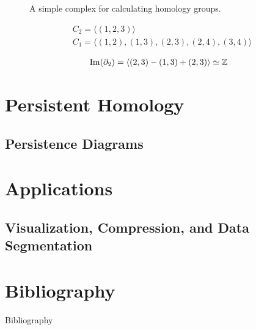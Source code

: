 \begin{frame}
	\begin{figure}
		
		\caption{A simple complex for calculating homology groups.}
	\end{figure}
	\begin{align*}
		&C_2 = \langle (1,2,3) \rangle \\
		&C_1 = \langle (1,2),(1,3),(2,3),(2,4),(3,4) \rangle \\
	\end{align*}
	\begin{align*}
		\operatorname{Im} (\partial_2) = \langle (2,3) - (1,3) + (2,3) \rangle \simeq \mathbb{Z}
	\end{align*}
\end{frame}





\section[Persistence]{Persistent Homology}
\subsection{Persistence Diagrams}
\begin{frame}
\end{frame}

\section{Applications}
\subsection{Visualization, Compression, and Data Segmentation}
\begin{frame}
\end{frame}

\section*{Bibliography}
\begin{frame}{Bibliography}
	\nocite{wagner}
	\nocite{hatcher}
	\nocite{fraleigha}
	\begingroup
	\renewcommand{\section}[2]{}%
	
	\endgroup
\end{frame}





